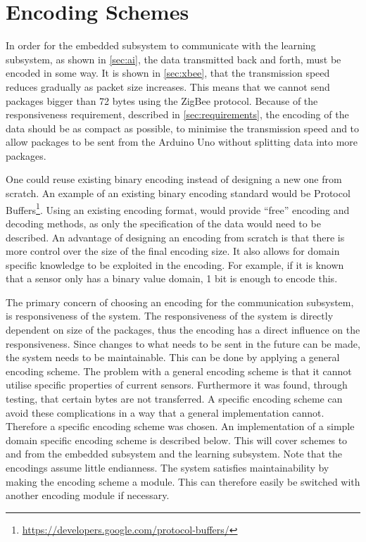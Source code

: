 \section{Encoding Schemes}
\label{sec:encoding}
In order for the embedded subsystem to communicate with the learning subsystem, as shown in \cref{sec:ai}, the data transmitted back and forth, must be encoded in some way. It is shown in \cref{sec:xbee}, that the transmission speed reduces gradually as packet size increases. This means that we cannot send packages bigger than 72 bytes \cite{xbee_latency} using the ZigBee protocol. Because of the responsiveness requirement, described in \cref{sec:requirements}, the encoding of the data should be as compact as possible, to minimise the transmission speed and to allow packages to be sent from the Arduino Uno without splitting data into more packages.

One could reuse existing binary encoding instead of designing a new one from scratch. An example of an existing binary encoding standard would be Protocol Buffers\footnote{\url{https://developers.google.com/protocol-buffers/}}. Using an existing encoding format, would provide \enquote{free} encoding and decoding methods, as only the specification of the data would need to be described. An advantage of designing an encoding from scratch is that there is more control over the size of the final encoding size. It also allows for domain specific knowledge to be exploited in the encoding. For example, if it is known that a sensor only has a binary value domain, 1 bit is enough to encode this.

The primary concern of choosing an encoding for the communication subsystem, is responsiveness of the system.
The responsiveness of the system is directly dependent on size of the packages, thus the encoding has a direct influence on the responsiveness. Since changes to what needs to be sent in the future can be made, the system needs to be maintainable. This can be done by applying a general encoding scheme. The problem with a general encoding scheme is that it cannot utilise specific properties of current sensors. Furthermore it was found, through testing, that certain bytes are not transferred. A specific encoding scheme can avoid these complications in a way that a general implementation cannot. Therefore a specific encoding scheme was chosen. An implementation of a simple domain specific encoding scheme is described below. This will cover schemes to and from the embedded subsystem and the learning subsystem. Note that the encodings assume little endianness. The system satisfies maintainability by making the encoding scheme a module. This can therefore easily be switched with another encoding module if necessary.

